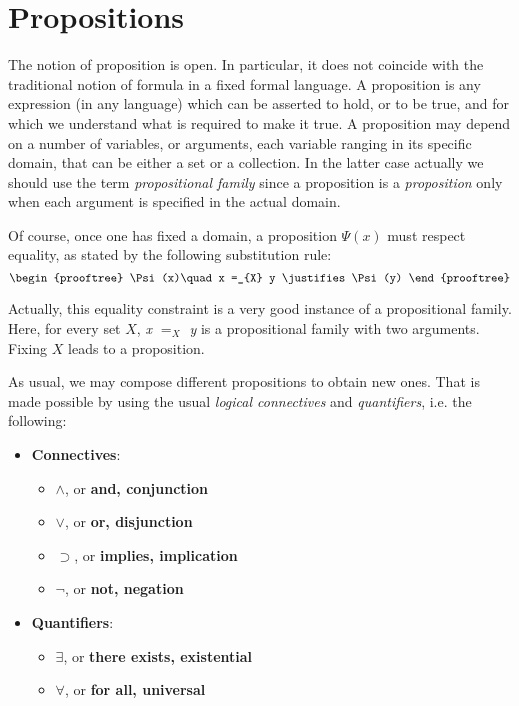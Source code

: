 \section{Propositions}
The notion of proposition is open. In particular, it does not coincide with the traditional notion of formula in a fixed formal language. A proposition is any expression (in any language) which can be asserted to hold, or to be true, and for which we understand what is required to make it true. A proposition may depend on a number of variables, or arguments, each variable ranging in its specific domain, that can be either a set or a collection. In the latter case actually we should use the term \textit{propositional family} since a proposition is a \textit{proposition} only when each argument is specified in the actual domain. 

Of course, once one has fixed a domain, a proposition $\Psi(x)$ must respect equality, as stated by the following substitution rule:
\[
	\begin{prooftree}
		\Psi(x)\quad
		x =_{X} y
		\justifies
		\Psi(y)
	\end{prooftree}
\]

Actually, this equality constraint is a very good instance of a propositional family. Here, for every set $X$, \textit{x $=_{X}$ y} is a propositional family with two arguments. Fixing $X$ leads to a proposition.

As usual, we may compose different propositions to obtain new ones. That is made possible by using the usual \textit{logical connectives} and \textit{quantifiers}, i.e. the following:
\begin{itemize}
	\item \textbf{Connectives}:
	\begin{itemize}
		\item $\wedge$, or \textbf{and, conjunction}
		\item $\vee$, or \textbf{or, disjunction}
		\item $\supset$, or \textbf{implies, implication}
		\item $\neg$, or \textbf{not, negation}
	\end{itemize}
	\item \textbf{Quantifiers}:
	\begin{itemize}
		\item $\exists$, or \textbf{there exists, existential}
		\item $\forall$, or \textbf{for all, universal}
	\end{itemize}
\end{itemize}

